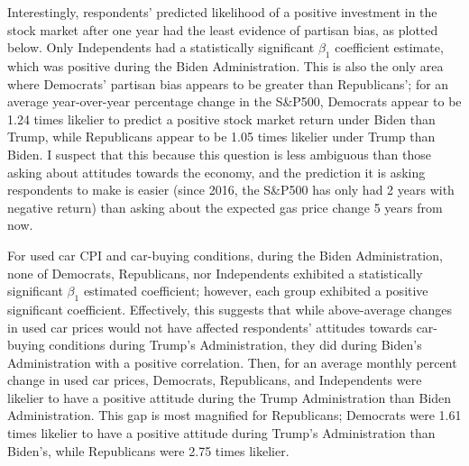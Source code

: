 \documentclass{article}
\begin{document}
Interestingly, respondents' predicted likelihood of a positive investment in the stock market after one year had the least evidence of partisan bias, as plotted below. Only Independents had a statistically significant $\beta_1$ coefficient estimate, which was positive during the Biden Administration. This is also the only area where Democrats' partisan bias appears to be greater than Republicans'; for an average year-over-year percentage change in the S\&P500, Democrats appear to be 1.24 times likelier to predict a positive stock market return under Biden than Trump, while Republicans appear to be 1.05 times likelier under Trump than Biden. I suspect that this because this question is less ambiguous than those asking about attitudes towards the economy, and the prediction it is asking respondents to make is easier (since 2016, the S\&P500 has only had 2 years with negative return) than asking about the expected gas price change 5 years from now. 

For used car CPI and car-buying conditions, during the Biden Administration, none of Democrats, Republicans, nor Independents exhibited a statistically significant $\beta_1$ estimated coefficient; however, each group exhibited a positive significant coefficient. Effectively, this suggests that while above-average changes in used car prices would not have affected respondents' attitudes towards car-buying conditions during Trump's Administration, they did during Biden's Administration with a positive correlation. Then, for an average monthly percent change in used car prices, Democrats, Republicans, and Independents were likelier to have a positive attitude during the Trump Administration than Biden Administration. This gap is most magnified for Republicans; Democrats were 1.61 times likelier to have a positive attitude during Trump's Administration than Biden's, while Republicans were 2.75 times likelier. 
\end{document}
